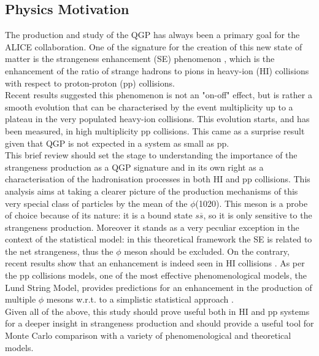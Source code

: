 \subsection{Physics Motivation}
The production and study of the QGP has always been a primary goal for the ALICE collaboration. One of the signature for the creation of this new state of matter is the strangeness enhancement (SE) phenomenon \cite{First_SE}, which is the enhancement of the ratio of strange hadrons to pions in heavy-ion (HI) collisions with respect to proton-proton (pp) collisions.\\
\indent Recent results suggested this phenomenon is not an "on-off" effect, but is rather a smooth evolution that can be characterised by the event multiplicity up to a plateau in the very populated heavy-ion collisions. This evolution starts, and has been measured, in high multiplicity pp collisions\cite{SE_in_pp}. This came as a surprise result given that QGP is not expected in a system as small as pp.\\
\indent This brief review should set the stage to understanding the importance of the strangeness production as a QGP signature and in its own right as a characterisation of the hadronisation processes in both HI and pp collisions. This analysis aims at taking a clearer picture of the production mechanisms of this very special class of particles by the mean of the $\phi$(1020). This meson is a probe of choice because of its nature: it is a bound state $s\overline{s}$, so it is only sensitive to the strangeness production. Moreover it stands as a very peculiar exception in the context of the statistical model: in this theoretical framework the SE is related to the net strangeness, thus the $\phi$ meson should be excluded. On the contrary, recent results show that an enhancement is indeed seen in HI collisions \cite{SE_HI}. As per the pp collisions models, one of the most effective phenomenological models, the Lund String Model, provides predictions for an enhancement in the production of multiple $\phi$ mesons w.r.t. to a simplistic statistical approach \cite{LUND}.\\
\indent Given all of the above, this study should prove useful both in HI and pp systems for a deeper insight in strangeness production and should provide a useful tool for Monte Carlo comparison with a variety of phenomenological and theoretical models.












